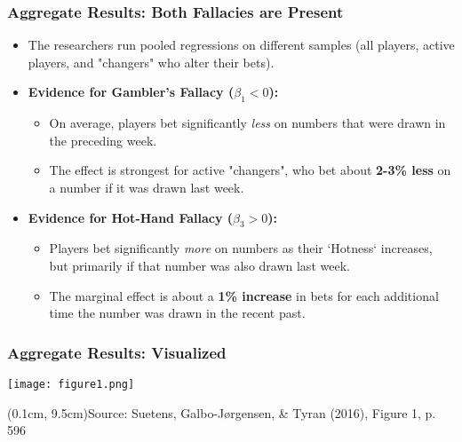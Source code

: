\documentclass{beamer}
\newcommand{\source}[1]{\begin{textblock*}{\textwidth}(0.1cm, 9.5cm)\tiny Source: #1\end{textblock*}}
\begin{document}
\begin{frame}
    \frametitle{Aggregate Results: Both Fallacies are Present}
    \begin{itemize}
        \item The researchers run pooled regressions on different samples (all players, active players, and "changers" who alter their bets).
        \vspace{1em}
        \item \textbf{Evidence for Gambler's Fallacy ($\beta_1 < 0$):}
        \begin{itemize}
            \item On average, players bet significantly \textit{less} on numbers that were drawn in the preceding week.
            \item The effect is strongest for active "changers", who bet about \textbf{2-3\% less} on a number if it was drawn last week.
        \end{itemize}
        \vspace{1em}
        \item \textbf{Evidence for Hot-Hand Fallacy ($\beta_3 > 0$):}
        \begin{itemize}
            \item Players bet significantly \textit{more} on numbers as their `Hotness` increases, but primarily if that number was also drawn last week.
            \item The marginal effect is about a \textbf{1\% increase} in bets for each additional time the number was drawn in the recent past.
        \end{itemize}
    \end{itemize}
\end{frame}

\begin{frame}
    \frametitle{Aggregate Results: Visualized}
    \begin{center}
        \texttt{[image: figure1.png]}
    \end{center}
    \source{Suetens, Galbo-Jørgensen, \& Tyran (2016), Figure 1, p. 596}
\end{frame}
\end{document}
